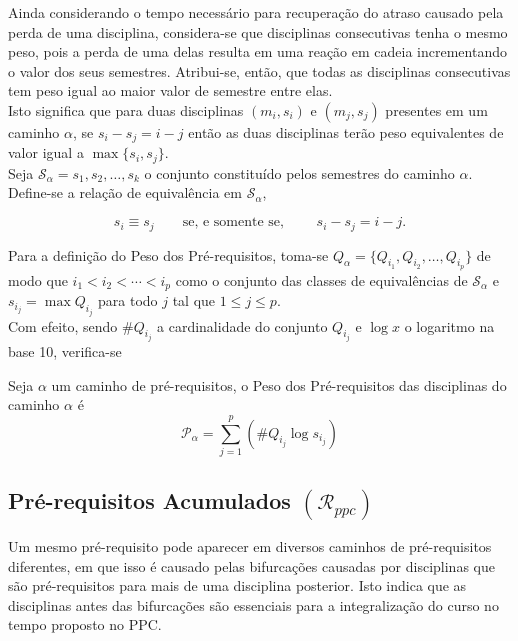 \documentclass[a4paper, 12pt]{article}
\begin{document}
Ainda considerando o tempo necessário para recuperação do atraso causado pela perda de uma disciplina, considera-se que disciplinas consecutivas tenha o 
mesmo peso, pois a perda de uma delas resulta em uma reação em cadeia incrementando o valor dos seus semestres. Atribui-se, então, que todas as disciplinas 
consecutivas tem peso igual ao maior valor de semestre entre elas. \\

Isto significa que para duas disciplinas $(m_i, s_i)$ e $(m_j, s_j)$ presentes em um caminho $\alpha$, se $s_i - s_j = i - j$ então as duas disciplinas 
terão peso equivalentes de valor igual a $\max{\{ s_i, s_j \}}$. \\

Seja $\mathcal{S}_\alpha = {s_1, s_2, \ldots, s_k}$ o conjunto constituído pelos semestres do caminho $\alpha$. Define-se a relação de equivalência em 
$\mathcal{S}_\alpha$, 

$$ s_i \equiv s_j \qquad \text{se, e somente se, } \qquad s_i - s_j = i - j. $$

Para a definição do Peso dos Pré-requisitos, toma-se $Q_\alpha = \{ Q_{i_1}, Q_{i_2}, \ldots, Q_{i_p} \}$ de modo que $i_1 < i_2 < \cdots < i_p$ como 
o conjunto das classes de equivalências de $\mathcal{S}_\alpha$ e $s_{i_j} = \max Q_{i_j}$ para todo $j$ tal que $1 \leq j \leq p$. \\

Com efeito, sendo $\#Q_{i_j}$ a cardinalidade do conjunto $Q_{i_j}$ e $\log{x}$ o logaritmo na base 10, verifica-se

\begin{definicao}
Seja $\alpha$ um caminho de pré-requisitos, o Peso dos Pré-requisitos das disciplinas do caminho $\alpha$ é
$$ \mathcal{P}_\alpha = \sum_{j=1}^p (\#Q_{i_j}\log{s_{i_j}}) $$
\end{definicao}


\subsection*{Pré-requisitos Acumulados $(\mathcal{R}_{ppc})$}
Um mesmo pré-requisito pode aparecer em diversos caminhos de pré-requisitos diferentes, em que isso é causado pelas bifurcações causadas 
por disciplinas que são pré-requisitos para mais de uma disciplina posterior. Isto indica que as disciplinas antes das bifurcações são essenciais 
para a integralização do curso no tempo proposto no PPC. \\
\end{document}
